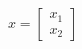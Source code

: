 \documentclass[preview]{standalone}
\begin{document}
\begin{align*}
x = \begin{bmatrix} x_1 \\ x_2 \end{bmatrix}
\end{align*}
\end{document}
